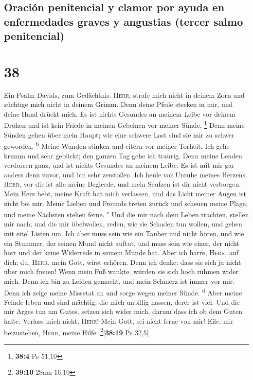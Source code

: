 \hypertarget{oraciuxf3n-penitencial-y-clamor-por-ayuda-en-enfermedades-graves-y-angustias-tercer-salmo-penitencial}{%
\subsection{Oración penitencial y clamor por ayuda en enfermedades
graves y angustias (tercer salmo
penitencial)}\label{oraciuxf3n-penitencial-y-clamor-por-ayuda-en-enfermedades-graves-y-angustias-tercer-salmo-penitencial}}

\hypertarget{section-37}{%
\section{38}\label{section-37}}

 Ein Psalm Davids, zum Gedächtnis. 
\textsc{Herr}, strafe mich nicht in deinem Zorn und züchtige mich nicht
in deinem Grimm.  Denn deine Pfeile stecken in mir, und
deine Hand drückt mich.  Es ist nichts Gesundes an meinem
Leibe vor deinem Drohen und ist kein Friede in meinen Gebeinen vor
meiner Sünde. \footnote{\textbf{38:4} Ps 51,10}  Denn
meine Sünden gehen über mein Haupt; wie eine schwere Last sind sie mir
zu schwer geworden. \textsuperscript{b}  Meine Wunden
stinken und eitern vor meiner Torheit.  Ich gehe krumm und
sehr gebückt; den ganzen Tag gehe ich traurig.  Denn meine
Lenden verdorren ganz, und ist nichts Gesundes an meinem Leibe.
 Es ist mit mir gar anders denn zuvor, und bin sehr
zerstoßen. Ich heule vor Unruhe meines Herzens. 
\textsc{Herr}, vor dir ist alle meine Begierde, und mein Seufzen ist dir
nicht verborgen.  Mein Herz bebt, meine Kraft hat mich
verlassen, und das Licht meiner Augen ist nicht bei mir. 
Meine Lieben und Freunde treten zurück und scheuen meine Plage, und
meine Nächsten stehen ferne. \textsuperscript{c}  Und die
mir nach dem Leben trachten, stellen mir nach; und die mir übelwollen,
reden, wie sie Schaden tun wollen, und gehen mit eitel Listen um.
 Ich aber muss sein wie ein Tauber und nicht hören, und
wie ein Stummer, der seinen Mund nicht auftut,  und muss
sein wie einer, der nicht hört und der keine Widerrede in seinem Munde
hat.  Aber ich harre, \textsc{Herr}, auf dich; du,
\textsc{Herr}, mein Gott, wirst erhören.  Denn ich denke:
dass sie sich ja nicht über mich freuen! Wenn mein Fuß wankte, würden
sie sich hoch rühmen wider mich.  Denn ich bin zu Leiden
gemacht, und mein Schmerz ist immer vor mir.  Denn ich
zeige meine Missetat an und sorge wegen meiner Sünde.
\textsuperscript{d}  Aber meine Feinde leben und sind
mächtig; die mich unbillig hassen, derer ist viel.  Und
die mir Arges tun um Gutes, setzen sich wider mich, darum dass ich ob
dem Guten halte.  Verlass mich nicht, \textsc{Herr}! Mein
Gott, sei nicht ferne von mir!  Eile, mir beizustehen,
\textsc{Herr}, meine Hilfe. \footnote{\textbf{39:10} 2Sam 16,10}{[}\textbf{38:19}
Ps 32,5{]}

